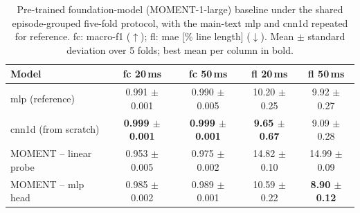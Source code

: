 \begin{table}[pos=ht]
\caption{Pre-trained foundation-model (MOMENT-1-large) baseline under the shared episode-grouped five-fold protocol, with the main-text \ac{mlp} and \ac{cnn1d} repeated for reference. \ac{fc}: macro-\ac{f1} ($\uparrow$); \ac{fl}: \ac{mae} [\% line length] ($\downarrow$). Mean $\pm$ standard deviation over 5 folds; best mean per column in bold.}
\label{tab:transformer_appendix}
\small
\centering
\begin{tabular}{lcccc}
\toprule
\textbf{Model} & \textbf{\ac{fc} 20\,ms} & \textbf{\ac{fc} 50\,ms} & \textbf{\ac{fl} 20\,ms} & \textbf{\ac{fl} 50\,ms} \\
\midrule
\ac{mlp} (reference)     & 0.991 $\pm$ 0.001 & 0.990 $\pm$ 0.005 & 10.20 $\pm$ 0.25 & \phantom{0}9.92 $\pm$ 0.27 \\
\ac{cnn1d} (from scratch) & \textbf{0.999 $\pm$ 0.001} & \textbf{0.999 $\pm$ 0.001} & \phantom{0}\textbf{9.65 $\pm$ 0.67} & \phantom{0}9.09 $\pm$ 0.28 \\
MOMENT -- linear probe   & 0.953 $\pm$ 0.005 & 0.975 $\pm$ 0.002 & 14.82 $\pm$ 0.10 & 14.99 $\pm$ 0.09 \\
MOMENT -- \ac{mlp} head  & 0.985 $\pm$ 0.002 & 0.989 $\pm$ 0.001 & 10.59 $\pm$ 0.22 & \phantom{0}\textbf{8.90 $\pm$ 0.12} \\
\bottomrule
\end{tabular}
\end{table}
